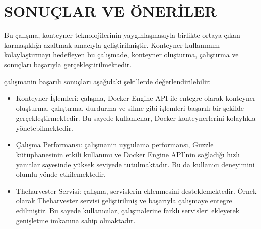 \section{SONUÇLAR VE ÖNERİLER}

Bu çalışma, konteyner teknolojilerinin yaygınlaşmasıyla birlikte ortaya çıkan karmaşıklığı azaltmak amacıyla geliştirilmiştir. Konteyner kullanımını kolaylaştırmayı hedefleyen bu çalışmade, konteyner oluşturma, çalıştırma ve sonuçları başarıyla gerçekleştirilmektedir. 

çalışmanin başarılı sonuçları aşağıdaki şekillerde değerlendirilebilir:
\begin{itemize}
    \item Konteyner İşlemleri: çalışma, Docker Engine API ile entegre olarak konteyner oluşturma, çalıştırma, durdurma ve silme gibi işlemleri başarılı bir şekilde gerçekleştirmektedir. Bu sayede kullanıcılar, Docker konteynerlerini kolaylıkla yönetebilmektedir.
    \item Çalışma Performansı: çalışmanin uygulama performansı, Guzzle kütüphanesinin etkili kullanımı ve Docker Engine API'nin sağladığı hızlı yanıtlar sayesinde yüksek seviyede tutulmaktadır. Bu da kullanıcı deneyimini olumlu yönde etkilemektedir.
    \item Theharvester Servisi: çalışma, servislerin eklenmesini desteklemektedir. Örnek olarak Theharvester servisi geliştirilmiş ve başarıyla çalışmaye entegre edilmiştir. Bu sayede kullanıcılar, çalışmalerine farklı servisleri ekleyerek genişletme imkanına sahip olmaktadır.
\end{itemize}




